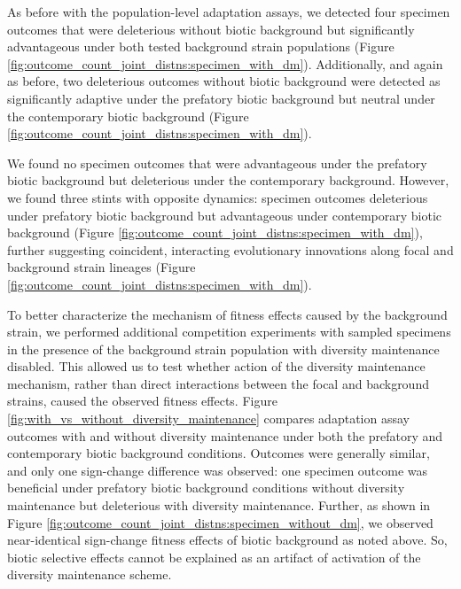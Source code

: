 As before with the population-level adaptation assays, we detected four specimen outcomes that were deleterious without biotic background but significantly advantageous under both tested background strain populations (Figure \ref{fig:outcome_count_joint_distns:specimen_with_dm}).
Additionally, and again as before, two deleterious outcomes without biotic background were detected as significantly adaptive under the prefatory biotic background but neutral under the contemporary biotic background (Figure \ref{fig:outcome_count_joint_distns:specimen_with_dm}).

We found no specimen outcomes that were advantageous under the prefatory biotic background but deleterious under the contemporary background.
However, we found three stints with opposite dynamics: specimen outcomes deleterious under prefatory biotic background but advantageous under contemporary biotic background (Figure \ref{fig:outcome_count_joint_distns:specimen_with_dm}), further suggesting coincident, interacting evolutionary innovations along focal and background strain lineages (Figure \ref{fig:outcome_count_joint_distns:specimen_with_dm}).



To better characterize the mechanism of fitness effects caused by the background strain, we performed additional competition experiments with sampled specimens in the presence of the background strain population with diversity maintenance disabled.
This allowed us to test whether action of the diversity maintenance mechanism, rather than direct interactions between the focal and background strains, caused the observed fitness effects.
Figure \ref{fig:with_vs_without_diversity_maintenance} compares adaptation assay outcomes with and without diversity maintenance under both the prefatory and contemporary biotic background conditions.
Outcomes were generally similar, and only one sign-change difference was observed: one specimen outcome was beneficial under prefatory biotic background conditions without diversity maintenance but deleterious with diversity maintenance.
Further, as shown in Figure \ref{fig:outcome_count_joint_distns:specimen_without_dm}, we observed near-identical sign-change fitness effects of biotic background as noted above.
So, biotic selective effects cannot be explained as an artifact of activation of the diversity maintenance scheme.



